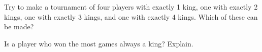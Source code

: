 \documentclass[12pt]{article}
\begin{document}
\newpage
\prob Try to make a tournament of four players with exactly 1 king, one with exactly 2 kings, one with exactly 3 kings, and one with exactly 4 kings. Which of these can be made?

\vspace{0.5cm}
\begin{center}
\hspace{0.7cm}\hspace{0.7cm}\hspace{0.7cm}

\vspace{0.6cm}
\hspace{0.7cm}\hspace{0.7cm}\hspace{0.7cm}
\end{center}

\vspace{2.5cm}
\prob Is a player who won the most games always a king? Explain.
\end{document}
